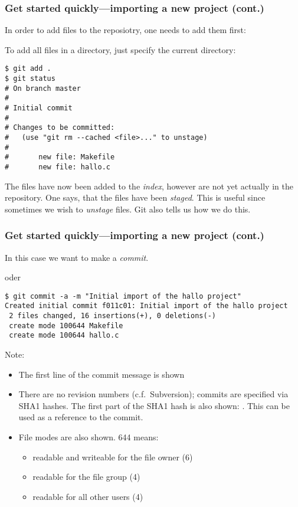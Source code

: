\begin{frame}[fragile]
\frametitle{Get started quickly---importing a new project (cont.)}

In order to add files to the reposiotry, one needs to add them first:


To add all files in a directory, just specify the current directory:

\begin{lstlisting}[basicstyle=\tiny\ttfamily\color{black}]
$ git add .
$ git status
# On branch master
#
# Initial commit
#
# Changes to be committed:
#   (use "git rm --cached <file>..." to unstage)
#
#       new file: Makefile
#       new file: hallo.c
\end{lstlisting}
The files have now been added to the \emph{index}, however are not yet
actually in the repository.  One says, that the files have been
\emph{staged}.  This is useful since sometimes we wish to \emph{unstage}
files.  Git also tells us how we do this.

\end{frame}

\begin{frame}[fragile]
\frametitle{Get started quickly---importing a new project (cont.)}
\vspace*{-3mm}
In this case we want to make a \emph{commit}.

 oder 

\begin{lstlisting}
$ git commit -a -m "Initial import of the hallo project"
Created initial commit f011c01: Initial import of the hallo project
 2 files changed, 16 insertions(+), 0 deletions(-)
 create mode 100644 Makefile
 create mode 100644 hallo.c
\end{lstlisting}

Note:
\begin{itemize}
    \item The first line of the commit message is shown
    \item There are no revision numbers (c.f.~Subversion); commits are
	specified via SHA1 hashes.  The first part of the SHA1 hash is also
	shown: .  This can be used as a reference to
	the commit.
\item File modes are also shown.  644 means:
    \begin{itemize}
    \item readable and writeable for the file owner (6)
    \item readable for the file group (4)
    \item readable for all other users (4)
    \end{itemize}
\end{itemize}
\end{frame}

